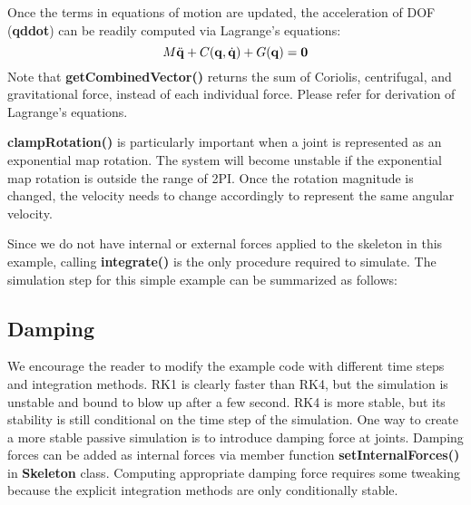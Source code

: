Once the terms in equations of motion are updated, the acceleration of
DOF (\textbf{qddot}) can be readily computed via Lagrange's equations:
\begin{equation}
M \ddot{\mathbf{q}} + C(\mathbf{q}, \dot{\mathbf{q}}) + G(\mathbf{q}) = \mathbf{0}
\end{equation}
Note that \textbf{getCombinedVector()} returns the sum of Coriolis,
centrifugal, and gravitational force, instead of each individual
force. Please refer \cite{dynamic-tutorial} for derivation of
Lagrange's equations.

\textbf{clampRotation()} is particularly important when a joint is
represented as an exponential map rotation. The system will become
unstable if the exponential map rotation is outside the range of
2PI. Once the rotation magnitude is changed, the velocity needs to
change accordingly to represent the same angular velocity.

Since we do not have internal or external forces applied to the
skeleton in this example, calling \textbf{integrate()} is the only
procedure required to simulate. The simulation step for this simple
example can be summarized as follows:


\subsection{Damping}
We encourage the reader to modify the example code with different time
steps and integration methods. RK1 is clearly faster than RK4, but the
simulation is unstable and bound to blow up after a few second. RK4 is
more stable, but its stability is still conditional on the time step
of the simulation. One way to create a more stable passive simulation
is to introduce damping force at joints. Damping forces can be added
as internal forces via member function \textbf{setInternalForces()} in
\textbf{Skeleton} class. Computing appropriate damping force requires
some tweaking because the explicit integration methods are only
conditionally stable. 

